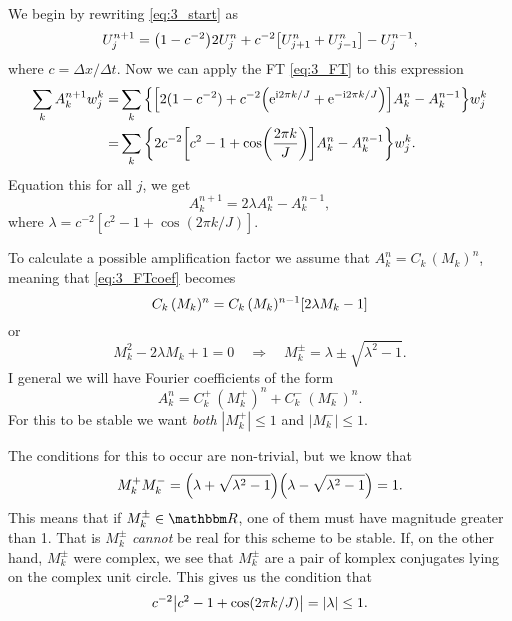 \documentclass[11pt,letter, swedish, english
]{article}
\newcommand{\Dx}{\ensuremath{\Delta{x}}}
\newcommand{\Dt}{\ensuremath{\Delta{t}}}
\begin{document}
We begin by rewriting \eqref{eq:3_start} as
\begin{equation}
U_j^{n+1}=\qty(1-c^{-2})2U_j^n+c^{-2}\qty[U_{j+1}^n+U_{j-1}^n]
-U_j^{n-1},
\end{equation}
where $c=\Dx/\Dt$. Now we can apply the FT \eqref{eq:3_FT} to this
expression
\begin{equation}
\begin{aligned}
\sum_kA_k^{n+1}w_j^k=&\sum_k \qty{\qty[
2(1-c^{-2})+c^{-2}\qty(\mathrm{e}^{\mathrm{i}2\pi k/J}+\mathrm{e}^{-\mathrm{i}2\pi k/J})]A_k^n
-A_k^{n-1} }w_j^k\\
=&\sum_k \qty{2c^{-2}\qty[
c^{2}-1+\cos(\frac{2\pi k}{J})]A_k^n
-A_k^{n-1} }w_j^k.
\end{aligned}
\end{equation}
Equation this for all $j$, we get
\begin{equation}\label{eq:3_FTcoef}
A_k^{n+1}=2\lambda A_k^n-A_k^{n-1},
\end{equation}
where $\lambda=c^{-2}[c^{2}-1+\cos(2\pi k/J)]$.

To calculate a possible amplification factor we assume that
$A_k^n=C_k\,(M_k)^n$, meaning that \eqref{eq:3_FTcoef} becomes
\begin{equation}
C_k\,(M_k)^n=C_k\,(M_k)^{n-1}\qty[2\lambda M_k-1]
\end{equation}
or
\begin{equation}
M_k^2-2\lambda M_k+1=0
\quad\Longrightarrow\quad
M_k^\pm=\lambda\pm\sqrt{\lambda^2-1}.
\end{equation}
I  general we will have Fourier coefficients of the form
\begin{equation}
A_k^n=C_k^+\,(M_k^+)^n+C_k^-\,(M_k^-)^n.
\end{equation}
For this to be stable we want \emph{both} $|M_k^+|\le1$ and
$|M_k^-|\le1$. 

The conditions for this to occur are non-trivial, but we know that 
\begin{equation}
M_k^+M_k^-=\qty(\lambda+\sqrt{\lambda^2-1})
\qty(\lambda-\sqrt{\lambda^2-1})
=1.
\end{equation}
This means that if $M_k^\pm\in\R$, one of them must have magnitude
greater than 1. That is $M_k^\pm$ \emph{cannot} be real for this
scheme to be stable. If, on the other hand, $M_k^\pm$ were complex, we
see that $M_k^\pm$ are a pair of komplex conjugates lying on the
complex unit circle. This gives us the condition that
\begin{equation}\label{eq:3_lambdacond}
c^{-2}\abs{c^{2}-1+\cos(2\pi k/J)}=|\lambda|\le1.
\end{equation}
\end{document}
